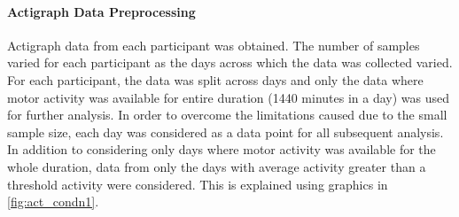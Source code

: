 \documentclass[11pt,a4paper]{article}
\newcommand{\noi}{\noindent}
\begin{document}
% 
% 

\paragraph{Actigraph Data Preprocessing}
Actigraph data from each participant was obtained. The number of samples varied for each participant as the days across which the data was collected varied. For each participant, the data was split across days and only the data where motor activity was available for entire duration (1440 minutes in a day) was used for further analysis. In order to overcome the limitations caused due to the small sample size, each day was considered as a data point for all subsequent analysis. In addition to considering only days where motor activity was available for the whole duration, data from only the days with average activity greater than a threshold activity were considered. This is explained using graphics in \autoref{fig:act_condn1}.
\end{document}
